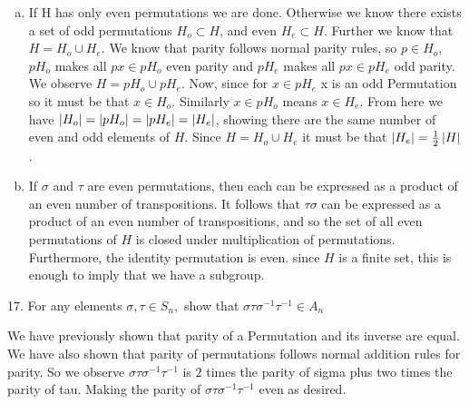 \begin{mdframed}[style=darkAnswer,frametitle={Joe Starr}]
  \begin{enumerate}[(a)]
    \item {If H has only even permutations we are done. Otherwise we know there
    exists a set of odd permutations $H_o\subset H$, and even $H_e\subset H$. Further
    we know that $H=H_o\cup H_e$. We know that parity follows normal parity rules, 
    so $p\in H_o$, $pH_o$ makes all $px\in pH_o$ even parity and $pH_e$ makes all $px\in pH_e$
    odd parity. We observe $H=pH_o\cup pH_e$. Now, since for $x\in {pH_e}$ x is 
    an odd Permutation so it must be that $x\in H_o$. Similarly $x\in pH_o$ means
    $x\in H_e$. From here we have  $\left\vert H_o\right\vert=\left\vert pH_o\right\vert=\left\vert pH_e\right\vert=\left\vert H_e\right\vert$, 
    showing there are the same number of even and odd elements of $H$. Since 
    $H=H_o\cup H_e$ it must be that $\left\vert H_e\right\vert=\frac{1}{2}\left\vert H\right\vert$.
    }
    \item {If $\sigma$ and $\tau$ are even permutations, 
    then each can be expressed as a product of an even number of transpositions.
    It follows that $\tau \sigma$ can be expressed as a product of an even 
    number of transpositions, and so the set of all even permutations of 
    $H$ is closed under multiplication of permutations. 
    Furthermore, the identity permutation is even. 
    since $H$ is a finite set, this is enough to imply that we have a 
    subgroup.}
  \end{enumerate}
\end{mdframed}
\newpage
\begin{mdframed}[style=darkQuesion]
  17. For any elements $\sigma, \tau \in S_{n},$ show that $\sigma \tau \sigma^{-1} \tau^{-1} \in A_{n}$
\end{mdframed}
\begin{mdframed}[style=darkAnswer,frametitle={Joe Starr}]
We have previously shown that parity of a Permutation and its inverse are equal. 
We have also shown that parity of permutations follows normal addition rules for 
parity. So we observe $\sigma \tau \sigma^{-1} \tau^{-1}$ is $2$ times the parity
of sigma plus two times the parity of tau. Making the parity of $\sigma \tau \sigma^{-1} \tau^{-1}$
even as desired. 
\end{mdframed}
